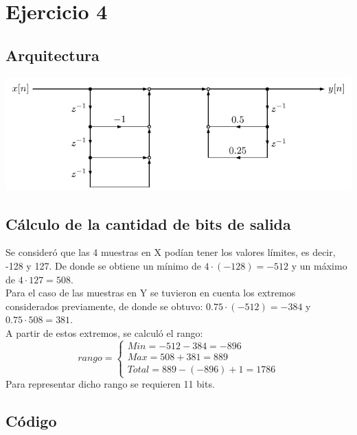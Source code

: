 \section{Ejercicio 4}
\subsection{Arquitectura}
\begin{center}
    \includegraphics[width=\linewidth]{../iir_filter/draw/draw.pdf}
\end{center}

\subsection{Cálculo de la cantidad de bits de salida}
Se consideró que las 4 muestras en X podían tener los valores límites, es decir, -128 y 127. De donde se obtiene un mínimo de $4\cdot(-128) = -512$ y un máximo de $4\cdot127 = 508$.\\
Para el caso de las muestras en Y se tuvieron en cuenta los extremos considerados previamente, de donde se obtuvo: $0.75\cdot(-512) = -384$ y $0.75\cdot508 = 381$.\\
A partir de estos extremos, se calculó el rango:
\[
    rango =
    \begin{cases}
        Min = -512-384 = -896\\
        Max = 508+381 = 889\\
        Total = 889 - (-896) + 1 = 1786
    \end{cases}
\]
Para representar dicho rango se requieren 11 bits.

\subsection{Código}
\inputminted[fontsize=\scriptsize]{systemverilog}{../iir_filter/rtl/iir_filter.sv}

